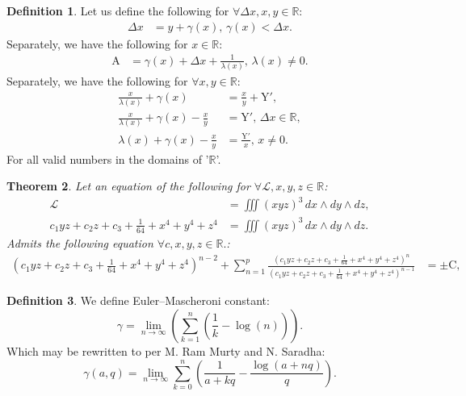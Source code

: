 \documentclass[10pt]{article}
\theoremstyle{plain}
\newtheorem{theorem}{Theorem}[section]
\theoremstyle{definition}
\newtheorem{definition}[theorem]{Definition}
\theoremstyle{remark}
\begin{document}
\begin{definition}
	Let us define the following for $\forall \Delta x, x, y \in \mathbb{R}$:
	\begin{align*}
	\Delta x &=	y + \gamma(x), \, \gamma(x) < \Delta x.
	\end{align*}
  	Separately, we have the following for $x \in \mathbb{R}$:
	\begin{align*}
		\mathrm{A} &= \gamma(x)+\Delta x + \frac{1}{\lambda(x)}, \, \lambda(x) \neq 0.
	\end{align*}
  Separately, we have the following  for $\forall x, y \in \mathbb{R}$:
	\begin{align*}
		\frac{x}{\lambda(x)} + \gamma(x) &= \frac{x}{y} + \mathrm{Y'},\\
		\frac{x}{\lambda(x)} + \gamma(x) - \frac{x}{y} &= \mathrm{Y'}, \, \Delta x \in \mathbb{R},\\
		\lambda(x) + \gamma(x) -\frac{x}{y} &= \frac{\mathrm{Y'}}{x}, \, x \neq 0.
	\end{align*}
	For all valid numbers in the domains of '$\mathbb{R}$'.
\end{definition}

\begin{theorem}
	Let an equation of the following for $\forall \mathcal{L}, x, y, z \in \mathbb{R}$:
	\begin{align*}
		\mathcal{L} &= \iiint (x y z)^{3} \, dx \land dy \land dz,\\
		c_{1} y z + c_{2} z + c_{3} + \frac{1}{64} + x^{4} + y^{4} + z^{4} &= \iiint (x y z)^{3} \, dx \land dy \land  dz.
	\end{align*}
	Admits the following equation $\forall c, x, y, z \in \mathbb{R}.$:
	\begin{align*}
		(c_{1} y z + c_{2} z + c_{3} + \frac{1}{64} + x^{4} + y^{4} + z^{4})^{n-2} + \sum_{n=1}^{p} \frac{ (c_{1} y z + c_{2} z + c_{3} + \frac{1}{64} + x^{4} + y^{4} + z^{4})^{n}}{ (c_{1} y z + c_{2} z + c_{3} + \frac{1}{64} + x^{4} + y^{4} + z^{4})^{n-1}} &= \pm \mathrm{C},
	\end{align*}
\end{theorem}

\begin{definition}
	We define Euler–Mascheroni constant:
	\begin{equation}
		\gamma = \lim_{n \to \infty}(\sum_{k=1}^{n}(\frac{1}{k}-\log(n))).
	\end{equation}
	Which may be rewritten to per M. Ram Murty and N. Saradha:
	\begin{equation}
		\gamma(a, q) = \lim_{n \to \infty}\sum_{k=0}^{n}(\frac{1}{a+kq}-\frac{\log(a+nq)}{q}).
	\end{equation}
\end{definition}
\end{document}
